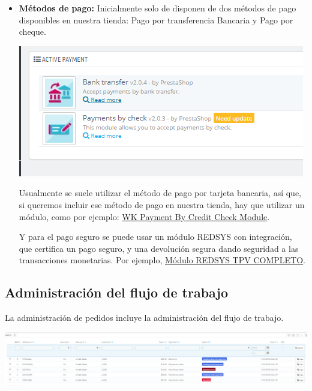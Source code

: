 \documentclass{article}
\begin{document}
			\begin{itemize}
				\item[\triangleright] \textbf{Métodos de pago:} Inicialmente solo de disponen de dos métodos de pago disponibles en nuestra tienda: Pago por transferencia Bancaria y Pago por cheque. 
				\begin{center}
				\includegraphics[scale=0.4]{images/pagos.png}
				\end{center}
				Usualmente se suele utilizar el método de pago por tarjeta bancaria, así que, si queremos incluir ese método de pago en nuestra tienda, hay que utilizar un módulo, como por ejemplo: \href{https://addons.prestashop.com/en/other-payment-methods/18635-wk-payment-by-credit-check.html&utm_source=back-office&utm_medium=search&utm_campaign=back-office-EN&utm_content=download}{WK Payment By Credit Check Module}.
				
Y para el pago seguro se puede usar un módulo REDSYS con integración, que certifica un pago seguro, y una devolución segura dando seguridad a las transacciones monetarias. Por ejemplo, \href{https://addons.prestashop.com/es/pago-tarjeta-carteras-digitales/16398-redsys-tpv-completo-pago-seguro-devoluciones.html}{Módulo REDSYS TPV COMPLETO}.
			\end{itemize}
			
\subsection{Administración del flujo de trabajo}
La administración de pedidos incluye la administración del flujo de trabajo.

\begin{center}
	\includegraphics[scale=0.25]{images/flujo.png}
\end{center}
\end{document}
